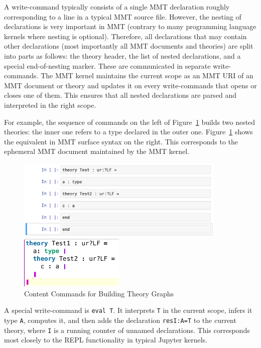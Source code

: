 A write-command typically consists of a single MMT declaration roughly corresponding to a line in a typical MMT source file.
However, the nesting of declarations is very important in MMT (contrary to many programming language kernels where nesting is optional).
Therefore, all declarations that may contain other declarations (most importantly all MMT documents and theories) are split into parts as follows: the theory header, the list of nested declarations, and a special end-of-nesting marker. These are communicated in separate write-commands.
The MMT kernel maintains the current scope as an MMT URI of an MMT document or theory and updates it on every write-commands that opens or closes one of them.
This ensures that all nested declarations are parsed and interpreted in the right scope.

For example, the sequence of commands on the left of Figure~\ref{fig:test_theory} builds two nested theories: the inner one refers to a type declared in the outer one. Figure~\ref{fig:test_theory} shows the equivalent in MMT surface syntax on the right. This corresponds to the ephemeral MMT document maintained by the MMT kernel.
\begin{figure}[ht]\centering
\begin{minipage}[c]{10cm}\includegraphics[width=10cm]{test_theory_jupyter}\end{minipage}
\begin{minipage}[c]{5cm}\includegraphics[width=5cm]{test_theory}\end{minipage}
\caption{Content Commands for Building Theory Graphs}\label{fig:test_theory}
\end{figure}

A special write-command is \texttt{eval T}.
It interprets \texttt{T} in the current scope, infers it type \texttt{A}, computes it, and then adds the declaration \texttt{resI:A=T} to the current theory, where \texttt{I} is a running counter of unnamed declarations.
This corresponds most closely to the REPL functionality in typical Jupyter kernels.

